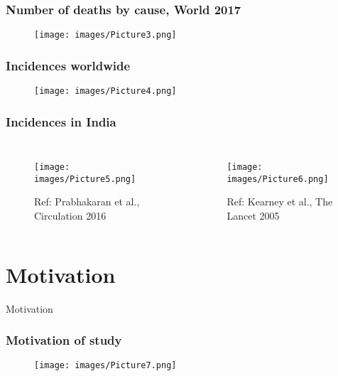 \documentclass{beamer}
\begin{document}
\begin{frame}
\frametitle{\textbf{Number of deaths by cause, World 2017}}
\begin{figure}
\texttt{[image: images/Picture3.png]}
\end{figure}
\end{frame}

\begin{frame}
\frametitle{\textbf{Incidences worldwide}}
\begin{figure}
\texttt{[image: images/Picture4.png]}
\end{figure}
\end{frame}

\begin{frame}
\frametitle{\textbf{Incidences in India}}
\begin{columns}[c] 
\begin{figure}
\texttt{[image: images/Picture5.png]}
\caption{\tiny Ref: Prabhakaran et al., Circulation 2016}
\end{figure}
\begin{figure}
\texttt{[image: images/Picture6.png]}
\caption{\tiny Ref: Kearney et al., The Lancet 2005}
\end{figure}
\end{columns}
\end{frame}





\section{Motivation}

\begin{frame}
\begin{block}
\Huge{\centerline{Motivation}}
\end{block}
\end{frame}

\begin{frame}
\frametitle{\textbf{Motivation of study}}
\begin{figure}
\texttt{[image: images/Picture7.png]}
\end{figure}
\end{frame}
\end{document}
